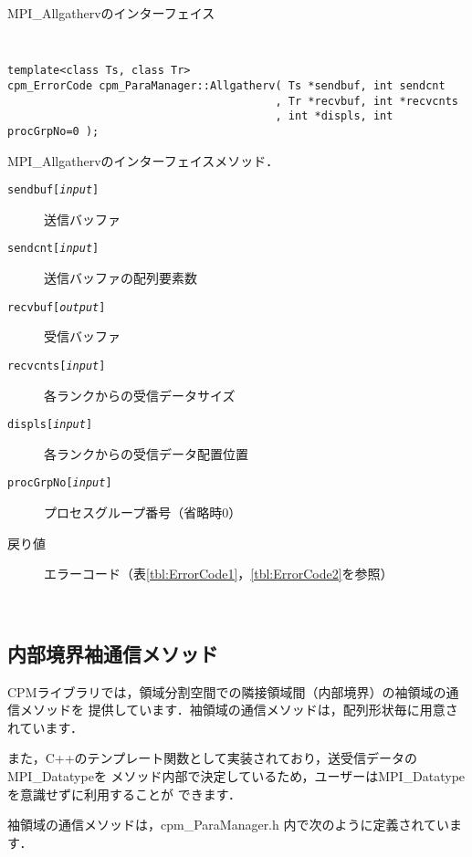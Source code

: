 \begin{spacing}{0.8}
\begin{itembox}[l]{MPI\_Allgathervのインターフェイス}
{\tt
\begin{verbatim}
template<class Ts, class Tr>
cpm_ErrorCode cpm_ParaManager::Allgatherv( Ts *sendbuf, int sendcnt
                                         , Tr *recvbuf, int *recvcnts
                                         , int *displs, int procGrpNo=0 );
\end{verbatim}
}
MPI\_Allgathervのインターフェイスメソッド．
\begin{description}
\item[{\tt sendbuf[{\it input}]}] 送信バッファ
\item[{\tt sendcnt[{\it input}]}] 送信バッファの配列要素数
\item[{\tt recvbuf[{\it output}]}] 受信バッファ
\item[{\tt recvcnts[{\it input}]}] 各ランクからの受信データサイズ
\item[{\tt displs[{\it input}]}] 各ランクからの受信データ配置位置
\item[{\tt procGrpNo[{\it input}]}] プロセスグループ番号（省略時0）
\\
\item[戻り値] エラーコード（表\ref{tbl:ErrorCode1}，\ref{tbl:ErrorCode2}を参照）
\end{description}
\end{itembox}\\
\end{spacing}


\clearpage


\subsection{内部境界袖通信メソッド}
\label{bndcomm}
CPMライブラリでは，領域分割空間での隣接領域間（内部境界）の袖領域の通信メソッドを
提供しています．袖領域の通信メソッドは，配列形状毎に用意されています．

また，C++のテンプレート関数として実装されており，送受信データのMPI\_Datatypeを
メソッド内部で決定しているため，ユーザーはMPI\_Datatypeを意識せずに利用することが
できます．

袖領域の通信メソッドは，cpm\_ParaManager.h 内で次のように定義されています．\\


